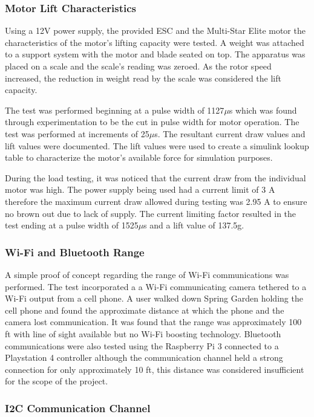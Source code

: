  \subsubsection{Motor Lift Characteristics}
 
 Using a 12V power supply, the provided ESC and the Multi-Star Elite motor the characteristics of the motor's lifting capacity were tested. A weight was attached to a support system with the motor and blade seated on top. The apparatus was placed on a scale and the scale's reading was zeroed. As the rotor speed increased, the reduction in weight read by the scale was considered the lift capacity.
 
 The test was performed beginning at a pulse width of 1127$\mu$s which was found through experimentation to be the cut in pulse width for motor operation. The test was performed at increments of 25$\mu$s. The resultant current draw values and lift values were documented. The lift values were used to create a simulink lookup table to characterize the motor's available force for simulation purposes. 
 
 During the load testing, it was noticed that the current draw from the individual motor was high. The power supply being used had a current limit of 3 A therefore the maximum current draw allowed during testing was 2.95 A to ensure no brown out due to lack of supply. The current limiting factor resulted in the test ending at a pulse width of 1525$\mu$s and a lift value of 137.5g.

  \subsubsection{Wi-Fi and Bluetooth Range}
  
  A simple proof of concept regarding the range of Wi-Fi communications was performed. The test incorporated a a Wi-Fi communicating camera tethered to a Wi-Fi output from a cell phone. A user walked down Spring Garden holding the cell phone and found the approximate distance at which the phone and the camera lost communication. It was found that the range was approximately 100 ft with line of sight available but no Wi-Fi boosting technology. Bluetooth communications were also tested using the Raspberry Pi 3 connected to a Playstation 4 controller although the communication channel held a strong connection for only approximately 10 ft, this distance was considered insufficient for the scope of the project.
  
  
  \subsubsection{I2C Communication Channel}
  
